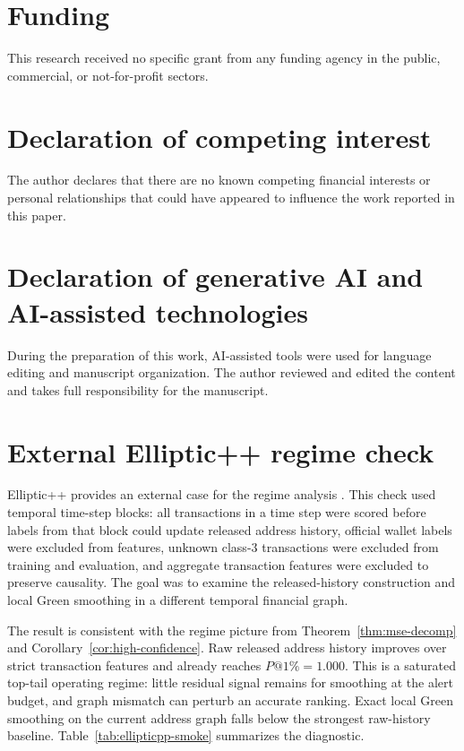 \documentclass[11pt]{article}
\theoremstyle{definition}
\theoremstyle{remark}
\begin{document}
\section*{Funding}
This research received no specific grant from any funding agency in the public, commercial, or not-for-profit sectors.

\section*{Declaration of competing interest}
The author declares that there are no known competing financial interests or personal relationships that could have appeared to influence the work reported in this paper.

\section*{Declaration of generative AI and AI-assisted technologies}
During the preparation of this work, AI-assisted tools were used for language editing and manuscript organization. The author reviewed and edited the content and takes full responsibility for the manuscript.

\appendix
\section{External Elliptic++ regime check}
\label{app:ellipticpp}

Elliptic++ provides an external case for the regime analysis \cite{elmougy2023}. This check used temporal time-step blocks: all transactions in a time step were scored before labels from that block could update released address history, official wallet labels were excluded from features, unknown class-3 transactions were excluded from training and evaluation, and aggregate transaction features were excluded to preserve causality. The goal was to examine the released-history construction and local Green smoothing in a different temporal financial graph.

The result is consistent with the regime picture from Theorem~\ref{thm:mse-decomp} and Corollary~\ref{cor:high-confidence}. Raw released address history improves over strict transaction features and already reaches $P@1\%=1.000$. This is a saturated top-tail operating regime: little residual signal remains for smoothing at the alert budget, and graph mismatch can perturb an accurate ranking. Exact local Green smoothing on the current address graph falls below the strongest raw-history baseline. Table~\ref{tab:ellipticpp-smoke} summarizes the diagnostic.
\end{document}
